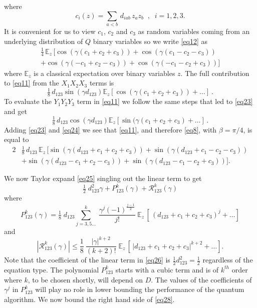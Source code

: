 \documentclass[t11pt,preprint,preprintnumbers]{revtex4}
\begin{document}
\noindent where      
\begin{equation}\label{eq20}
c_i(z)= \sum_{a < b}\, d_{iab}\, z_a  z_b \; \; , \; \; i=1,2,3. 
\end{equation}
\noindent It is convenient for us to view $c_1$, $c_2$ and $c_3$ as random variables coming from an underlying distribution of $Q$ binary variables so we write  \eqref{eq12} as
\begin{multline}\label{eq22}
\tfrac{1}{4}\, \mathbb{E}_z\, [ \cos(\gamma(c_1+c_2+c_3))+\cos(\gamma (c_1-c_2-c_3))\\
+\cos(\gamma (-c_1+ c_2 - c_3))+\cos(\gamma (-c_1 - c_2 + c_3))]  
\end{multline}
where $\mathbb{E}_z$ is a classical expectation over binary variables $z$. The full contribution to \eqref{eq11} from the $X_1 X_2 X_3$ terms is
\begin{equation}\label{eq23}
\tfrac{1}{8}\, d_{123} \sin (\gamma d_{123}) \mathbb{E}_z [\cos \left(\gamma (c_1 + c_2+c_3) \right) + \ldots ] \ .
\end{equation}
To evaluate the $Y_1 Y_2 Y_3$ term in \eqref{eq11} we follow the same steps that led to \eqref{eq23} and get 
\begin{equation}\label{eq24}   
\tfrac{1}{8}\,  d_{123} \cos(\gamma d_{123}) \mathbb{E}_z [\sin (\gamma (c_1+c_2+c_3) + \dots ] \, .
\end{equation}
 Adding \eqref{eq23}  and \eqref{eq24} we see that \eqref{eq11}, and therefore \eqref{eq8}, with $\beta = \pi/4$, is equal to 
 \begin{alignat}{2}\label{eq25}
& \tfrac{1}{8}\, d_{123}\, \mathbb{E}_z\, [\sin (\gamma (d_{123} + c_1 + c_2 + c_3)) 
  + \sin (\gamma (d_{123} + c_1 - c_2 - c_3)) \nonumber\\
 &+ \sin (\gamma (d_{123} - c_1 + c_2 - c_3))
  + \sin (\gamma (d_{123} - c_1 - c_2 + c_3))] .
 \end{alignat}

We now Taylor expand \eqref{eq25} singling  out the linear term to get
\begin{equation}\label{eq26}
\tfrac{1}{2}\; d^2_{123} \gamma + P^k_{123}  (\gamma) + \mathcal{R}^k_{123} (\gamma)
\end{equation}
where
\begin{equation}\label{eq27}
P^k_{123} (\gamma) = \tfrac{1}{8}\; d_{123} \sum\limits^k_{j = 3, 5 \ldots}\ \frac{\gamma^j (-1)^{\frac{j-1}{2}}}{j !}\ \mathbb{E}_z\, [\,(d_{123} + c_1+ c_2 + c_3)^j + \ldots ]
\end{equation}
and
\begin{equation}\label{eq28}
\left| \mathcal{R}^k_{123} (\gamma) \right| \leqslant \frac{1}{8}\ \frac{|\gamma|^{k+2}}{(k+2)!}\; \mathbb{E}_z\, [\, \left|d_{123} + c_1 + c_2+ c_3 \right|^{k+2} + \ldots] .
\end{equation}
Note  that the coefficient of the linear term in \eqref{eq26} is $\frac{1}{2} d^2_{123} = \frac{1}{2}$ regardless of the equation type. The polynomial $P^k_{123}$ starts with a cubic term and is of $k^{th}$ order where $k$, to be chosen shortly, will depend on $D$. The values of the coefficients of $\gamma^j$ in $P^k_{123}$ will play no role in lower bounding the performance of the quantum algorithm. We now bound the right hand side of \eqref{eq28}. 
\end{document}
